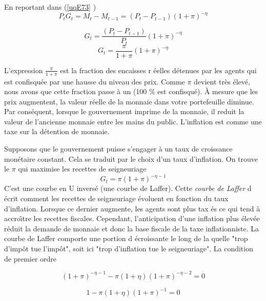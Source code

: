 \documentclass[a4paper,11pt]{article}
\begin{document}
En reportant dans (\ref{uqE73}%
) \begin{equation}
P_tG_t=M_t-M_{t-1}= (P_{t} -P_{t-1})(1+\pi)^{-\eta}  \label{E76}
\end{equation}
 
 
 \begin{equation}
G_t= \frac{(P_{t} -P_{t-1})}{P_t}(1+\pi)^{-\eta}  \label{E76}
\end{equation}
 \begin{equation}
G_t=  \frac{\pi}{1+\pi}(1+\pi)^{-\eta}  \label{Ee76}
\end{equation}

L'expression $\frac{\pi} {1+ \pi} $ est la fraction des encaisses r%
\'{e}elles d\'{e}tenues par les agents qui est confisquée par une hausse du niveau des prix. Comme $ \pi $ devient très élevé, nous avons que cette fraction passe à un (100 \% est confisqué). À mesure que les prix augmentent, la valeur réelle de la monnaie dans votre portefeuille diminue. Par conséquent, lorsque le gouvernement imprime de la monnaie, il reduit la valeur de l'ancienne monnaie entre les mains du public. L'inflation est comme une taxe sur la détention de monnaie.


Supposons que le gouvernement puisse s'engager à un taux de croissance monétaire constant. Cela se traduit par le choix d'un taux d'inflation. On trouve le  $ \pi $ qui maximise les  recettes de seigneuriage  \begin{equation}
G_t=   \pi(1+\pi)^{-\eta-1} \label{Ee763}
\end{equation}
C'est une courbe en U invers\'{e} (une courbe de Laffer). Cette \textit{courbe de Laffer } d%
\'{e}crit comment les recettes de seigneuriage  \'{e}voluent en fonction
du taux d'inflation. Lorsque ce dernier augmente, les agents sont plus tax%
\'{e}s ce qui tend \`{a} accro\^{\i}tre les recettes fiscales. Cependant,
l'anticipation d'une inflation plus \'{e}lev\'{e}e r\'{e}duit la demande de
monnaie et donc la base fiscale de la taxe inflationniste. La courbe de
Laffer comporte une portion d%
\'{e}croissante le long de la quelle "trop d'imp\^{o}t tue l'imp\^{o}t", soit
ici "trop d'inflation tue le seigneuriage". La condition de premier ordre

 \begin{equation}
(1+\pi)^{-\eta-1}-\pi(1+\eta)(1+\pi)^{-\eta-2} =0\label{foc}
\end{equation}

 \begin{equation}
1-\pi(1+\eta)(1+\pi)^{-1} =0\label{foc}
\end{equation}
\end{document}
